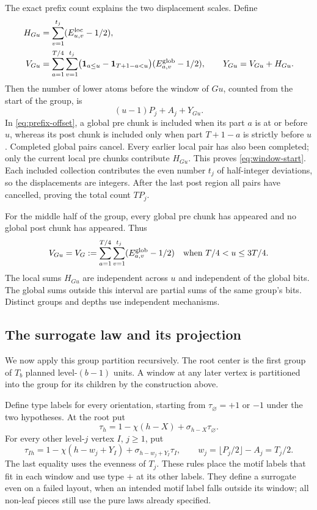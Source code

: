 The exact prefix count explains the two displacement scales.  Define
\begin{align}
 H_{Gu}&=\sum_{v=1}^{t_j}(E^{\rm loc}_{u,v}-1/2),\nonumber\\
 V_{Gu}&=\sum_{a=1}^{T/4}\sum_{v=1}^{t_j}
 \bigl({\bf1}_{a\le u}-{\bf1}_{T+1-a<u}\bigr)
       (E^{\rm glob}_{a,v}-1/2),\qquad Y_{Gu}=V_{Gu}+H_{Gu}.
 \label{eq:prefix-offset}
\end{align}
Then the number of lower atoms before the window of $Gu$, counted from the start of the group, is
\begin{equation}\label{eq:window-start}
 (u-1)P_j+A_j+Y_{Gu}.
\end{equation}
In \eqref{eq:prefix-offset}, a global pre chunk is included when its part $a$ is at or before $u$, whereas its post chunk is included only when part $T+1-a$ is strictly before $u$.  Completed global pairs cancel.  Every earlier local pair has also been completed; only the current local pre chunks contribute $H_{Gu}$.  This proves \eqref{eq:window-start}.  Each included collection contributes the even number $t_j$ of half-integer deviations, so the displacements are integers.  After the last post region all pairs have cancelled, proving the total count $TP_j$.

For the middle half of the group, every global pre chunk has appeared and no global post chunk has appeared.  Thus
\begin{equation}\label{eq:global-plateau}
 V_{Gu}=V_G:=\sum_{a=1}^{T/4}\sum_{v=1}^{t_j}
       (E^{\rm glob}_{a,v}-1/2)
       \quad\text{when }T/4<u\le3T/4.
\end{equation}
The local sums $H_{Gu}$ are independent across $u$ and independent of the global bits.  The global sums outside this interval are partial sums of the same group's bits.  Distinct groups and depths use independent mechanisms.

\subsection{The surrogate law and its projection}

We now apply this group partition recursively.  The root center is the first group of $T_b$ planned level-$(b-1)$ units.  A window at any later vertex is partitioned into the group for its children by the construction above.

Define type labels for every orientation, starting from $\tau_\varnothing=+1$ or $-1$ under the two hypotheses.  At the root put
\[
 \tau_h=1-\chi(h-X)+\sigma_{h-X}\tau_\varnothing.
\]
For every other level-$j$ vertex $I$, $j\ge1$, put
\begin{equation}\label{eq:surrogate-types}
 \tau_{Ih}=1-\chi(h-w_j+Y_I)+\sigma_{h-w_j+Y_I}\tau_I,
 \qquad w_j=\lfloor P_j/2\rfloor-A_j=T_j/2.
\end{equation}
The last equality uses the evenness of $T_j$.  These rules place the motif labels that fit in each window and use type $+$ at its other labels.  They define a surrogate even on a failed layout, when an intended motif label falls outside its window; all non-leaf pieces still use the pure laws already specified.

